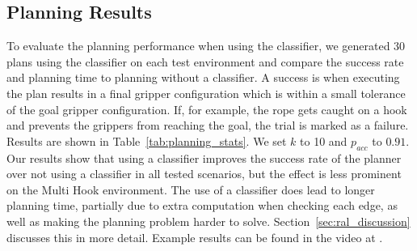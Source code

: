 \subsection{Planning Results}

To evaluate the planning performance when using the classifier, we generated 30 plans using the classifier on each test environment and compare the success rate and planning time to planning without a classifier. A success is when executing the plan results in a final gripper configuration which is within a small tolerance of the goal gripper configuration. If, for example, the rope gets caught on a hook and prevents the grippers from reaching the goal, the trial is marked as a failure. Results are shown in Table~\ref{tab:planning_stats}. We set $k$ to 10 and $p_{acc}$ to $0.91$. Our results show that using a classifier improves the success rate of the planner over not using a classifier in all tested scenarios, but the effect is less prominent on the Multi Hook environment. The use of a classifier does lead to longer planning time, partially due to extra computation when checking each edge, as well as making the planning problem harder to solve. Section~\ref{sec:ral_discussion} discusses this in more detail. Example results can be found in the video at \ralurl.


